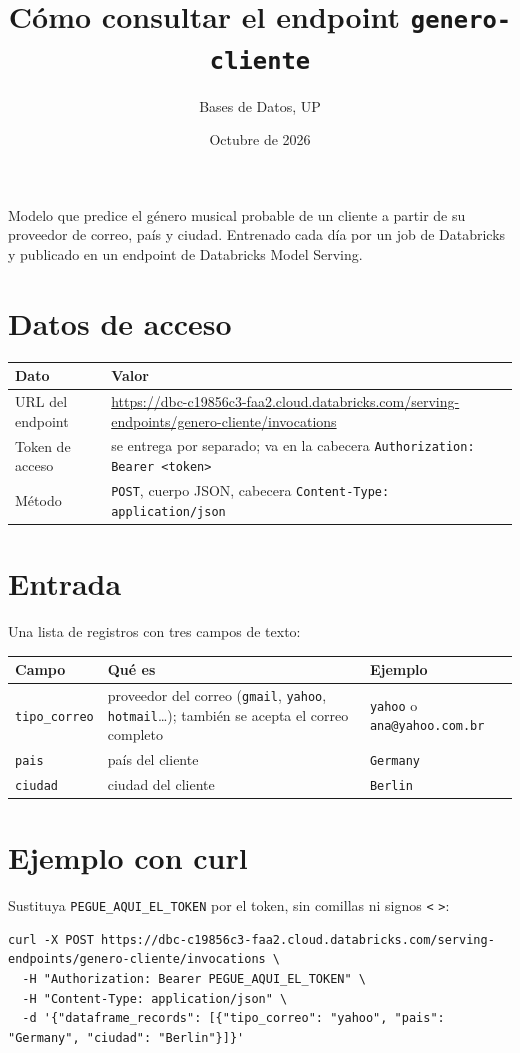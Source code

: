 \documentclass[11pt,a4paper]{article}
\title{Cómo consultar el endpoint \texttt{genero-cliente}}
\author{Bases de Datos, UP}
\date{Octubre de 2026}
\begin{document}
\maketitle

Modelo que predice el género musical probable de un cliente a partir de su proveedor de correo, país y
ciudad. Entrenado cada día por un job de Databricks y publicado en un endpoint de Databricks Model Serving.

\section*{Datos de acceso}
\begin{tabular}{@{}L{3.2cm}L{12.3cm}@{}}
\toprule
\textbf{Dato} & \textbf{Valor} \tabularnewline
\midrule
URL del endpoint & \url{https://dbc-c19856c3-faa2.cloud.databricks.com/serving-endpoints/genero-cliente/invocations} \tabularnewline
Token de acceso & se entrega por separado; va en la cabecera \texttt{Authorization: Bearer <token>} \tabularnewline
Método & \texttt{POST}, cuerpo JSON, cabecera \texttt{Content-Type: application/json} \tabularnewline
\bottomrule
\end{tabular}

\section*{Entrada}
Una lista de registros con tres campos de texto:

\begin{tabular}{@{}L{2.6cm}L{8.4cm}L{4.5cm}@{}}
\toprule
\textbf{Campo} & \textbf{Qué es} & \textbf{Ejemplo} \tabularnewline
\midrule
\texttt{tipo\_correo} & proveedor del correo (\texttt{gmail}, \texttt{yahoo}, \texttt{hotmail}\ldots); también se acepta el correo completo & \texttt{yahoo} o \texttt{ana@yahoo.com.br} \tabularnewline
\texttt{pais} & país del cliente & \texttt{Germany} \tabularnewline
\texttt{ciudad} & ciudad del cliente & \texttt{Berlin} \tabularnewline
\bottomrule
\end{tabular}

\section*{Ejemplo con curl}
Sustituya \texttt{PEGUE\_AQUI\_EL\_TOKEN} por el token, sin comillas ni signos \texttt{<} \texttt{>}:

\begin{lstlisting}
curl -X POST https://dbc-c19856c3-faa2.cloud.databricks.com/serving-endpoints/genero-cliente/invocations \
  -H "Authorization: Bearer PEGUE_AQUI_EL_TOKEN" \
  -H "Content-Type: application/json" \
  -d '{"dataframe_records": [{"tipo_correo": "yahoo", "pais": "Germany", "ciudad": "Berlin"}]}'
\end{lstlisting}
\end{document}
